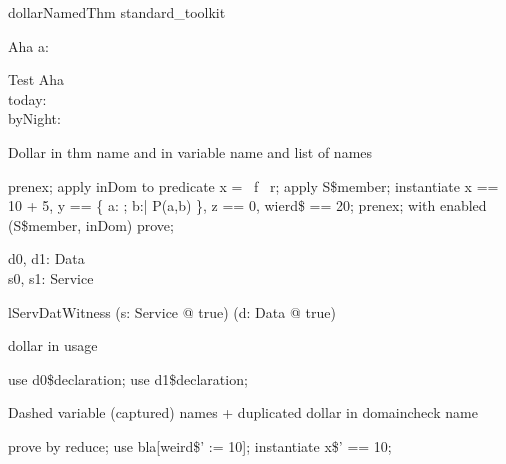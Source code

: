 \begin{zsection}
   \SECTION dollarNamedThm \parents standard\_toolkit
\end{zsection}

\begin{schema}{Aha}
   a: \nat
\end{schema}

\begin{schema}{Test}
   \Delta Aha \\
   today: \nat \\
   byNight: \nat
\end{schema}

Dollar in thm name and in variable name and list of names
\begin{zproof}
prenex;
apply inDom to predicate x = \dom~f \cup \dom~r;
apply S\$member;
instantiate x == 10 + 5, y == \{ a: \nat; b:\nat | P(a,b) \},
    z == 0, wierd\$ == 20; %
prenex;
with enabled (S\$member, inDom) prove;
\end{zproof}

\begin{zed}
\end{zed}

\begin{axdef}
   d0, d1: Data
\\
   s0, s1: Service
\end{axdef}

\begin{theorem}{lServDatWitness}
   (\exists s: Service @ true) \land (\exists d: Data @ true)
\end{theorem}

dollar in usage
\begin{zproof}[lServDatWitness]
use d0\$declaration;
use d1\$declaration;
\end{zproof}

Dashed variable (captured) names + duplicated dollar in domaincheck name
\begin{zproof}
prove by reduce;
use bla[weird\$' := 10];
instantiate x\$' == 10;
\end{zproof}


